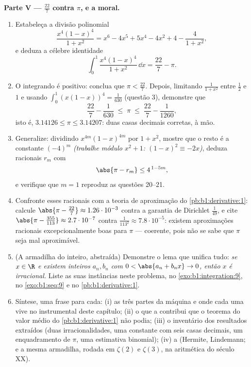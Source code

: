 \begin{problem}
\medskip
\noindent\textbf{Parte V --- $\frac{22}{7}$ contra $\pi$, e a
moral.}
\begin{enumerate}
  \item Estabeleça a divisão polinomial
        \[
        \frac{x^4(1-x)^4}{1 + x^2}
        = x^6 - 4x^5 + 5x^4 - 4x^2 + 4 - \frac{4}{1 + x^2},
        \]
        e deduza a célebre identidade
        \[
        \int_0^1 \frac{x^4 (1-x)^4}{1 + x^2}\,\dd x
        = \frac{22}{7} - \pi .
        \]
  \item O integrando é positivo: conclua que $\pi <
        \frac{22}{7}$. Depois, limitando $\frac{1}{1+x^2}$ entre
        $\frac12$ e $1$ e usando $\int_0^1 (x(1-x))^4 =
        \frac{1}{630}$ (questão 3), demonstre que
        \[
        \frac{22}{7} - \frac{1}{630} \;\leq\; \pi \;\leq\;
        \frac{22}{7} - \frac{1}{1260} ,
        \]
        isto é, $3.14126 \leq \pi \leq 3.14207$: duas casas
        decimais corretas, à mão.
  \item Generalize: dividindo $x^{4m}(1-x)^{4m}$ por $1 + x^2$,
        mostre que o resto é a constante $(-4)^m$ \emph{(trabalhe
        módulo $x^2 + 1$: $(1-x)^2 \equiv -2x$)}, deduza
        racionais $r_m$ com
        \[
        \abs{\pi - r_m} \leq 4^{\,1 - 5m} ,
        \]
        e verifique que $m = 1$ reproduz as questões 20--21.
  \item Confronte esses racionais com a teoria de aproximação
        do \cref{pb:b1:derivative:1}: calcule $\abs{\pi -
        \frac{22}{7}} \approx 1.26\cdot10^{-3}$ contra a
        garantia de Dirichlet $\frac{1}{49}$, e cite
        $\abs{\pi - \frac{355}{113}} \approx 2.7\cdot10^{-7}$
        contra $\frac{1}{113^2} \approx 7.8\cdot10^{-5}$:
        existem aproximações racionais excepcionalmente boas para
        $\pi$ --- coerente, pois não se sabe que $\pi$ seja
        mal aproximável.
  \item (A armadilha do inteiro, abstraída) Demonstre o lema que
        unifica tudo: \emph{se $x \in \R$ e existem
        inteiros $a_n, b_n$ com $0 < \abs{a_n + b_n x} \to 0$,
        então $x$ é irracional.} Liste as suas instâncias neste
        problema, no \cref{exo:b1:integration:9}, no
        \cref{exo:b1:seq:9} e no \cref{pb:b1:derivative:1}.
  \item Síntese, uma frase para cada: (i) as três partes da
        máquina e onde cada uma vive no instrumental deste
        capítulo; (ii) o que a  contribui que o
        teorema do valor médio do \cref{pb:b1:derivative:1} não
        podia; (iii) o inventário dos resultados extraídos (duas
        irracionalidades, uma constante com seis casas decimais, um
        enquadramento de $\pi$, uma estimativa binomial); (iv) a
         (Hermite, Lindemann; e a mesma armadilha, rodada em
        $\zeta(2)$ e $\zeta(3)$, na aritmética do século XX).
\end{enumerate}
\end{problem}
